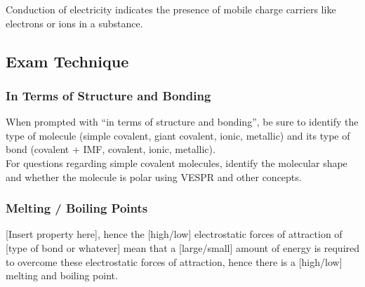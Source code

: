 \documentclass[../main]{subfiles}
\begin{document}
	Conduction of electricity indicates the presence of mobile charge carriers like electrons or ions in a substance.

	\subsection{Exam Technique}


	\subsubsection{In Terms of Structure and Bonding}

	When prompted with ``in terms of structure and bonding'', be sure to identify the type of molecule (simple covalent, giant covalent, ionic, metallic) and its type of bond (covalent + IMF, covalent, ionic, metallic). \\

	For questions regarding simple covalent molecules, identify the molecular shape and whether the molecule is polar using VESPR and other concepts.

	\subsubsection{Melting / Boiling Points}

	[Insert property here], hence the [high/low] electrostatic forces of attraction of [type of bond or whatever] mean that a [large/small] amount of energy is required to overcome these electrostatic forces of attraction, hence there is a [high/low] melting and boiling point.
\end{document}
